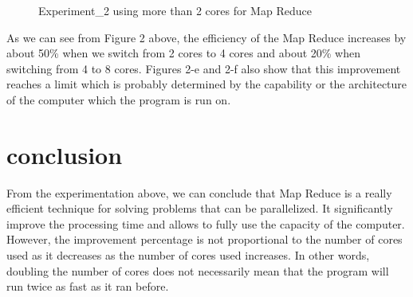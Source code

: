 \documentclass[12pt]{article}
\begin{document}
\begin{figure}[H]
 			\hfill
 			\hfill
 			\hfill
 			\caption{Experiment\_2 using more than 2 cores for Map Reduce}
 		\end{figure}
 		
 		As we can see from Figure 2 above, the efficiency of the Map Reduce increases by about 50\%  when we switch from 2 cores to 4 cores and about 20\% when switching from 4 to 8 cores. Figures 2-e and 2-f also show that this improvement reaches a limit which is probably determined by the capability or the architecture of the computer which the program is run on. 
 		
 	\section{conclusion}
 		From the experimentation above, we can conclude that Map Reduce is a really efficient technique for solving problems that can be parallelized. It significantly improve the processing time and allows to fully use the capacity of the computer. However, the improvement percentage is not proportional to the number of cores used as it decreases as the number of cores used increases. In other words, doubling the number of cores does not necessarily mean that the program will run twice as fast as it ran before.
	
	
	
\end{document}
